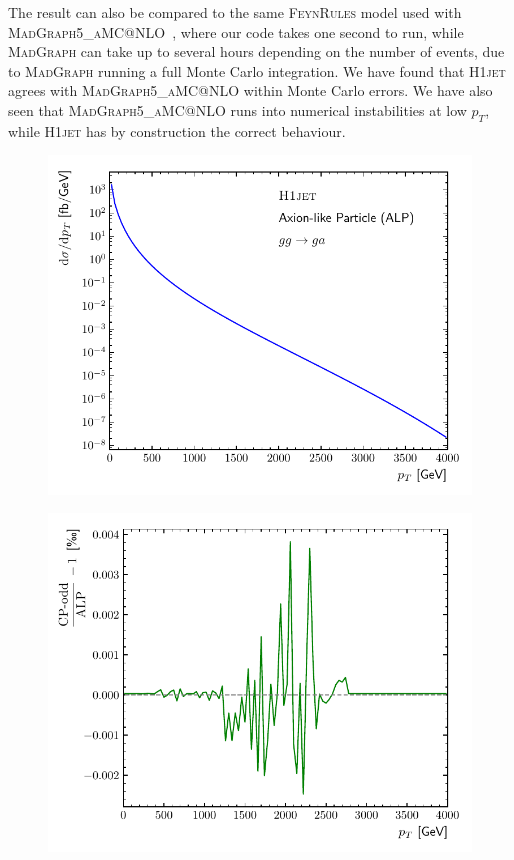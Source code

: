\documentclass[12pt]{article}
\begin{document}
The result can also be compared to the same \textsc{FeynRules} model
used with \textsc{\linebreak MadGraph5\_aMC@NLO}~\cite{Alwall:2014hca}, where our
code takes one second to run, while \textsc{MadGraph} can take up to
several hours depending on the number of events, due to
\textsc{MadGraph} running a full Monte Carlo integration. We have
found that \textsc{H1jet} agrees with \textsc{MadGraph5\_aMC@NLO}
within Monte Carlo errors. We have also seen that
\textsc{MadGraph5\_aMC@NLO} runs into numerical instabilities at low
$p_T$, while \textsc{H1jet} has by construction the correct behaviour.
\begin{figure}[tbh] 
\centering
\begin{minipage}{.485\textwidth}
  \centering
  \includegraphics[width=\linewidth]{figures/ALPresult.pdf}
  \label{fig:alpresult}
\end{minipage}%
\hfill%
\begin{minipage}{.485\textwidth}
  \centering
  \includegraphics[width=\linewidth]{figures/ALPratio.pdf}

\end{minipage}
\end{figure}
\end{document}
